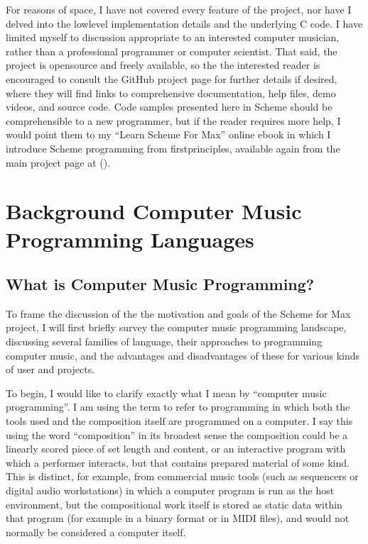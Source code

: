 \documentclass[letterpaper,10pt,english]{sphinxmanual}
\begin{document}
\sphinxAtStartPar
For reasons of space, I have not covered every feature of the project, nor have I delved into the
low\sphinxhyphen{}level implementation details and the underlying C code. I have limited myself to discussion appropriate
to an interested computer musician, rather than a professional programmer or computer scientist.
That said, the project is open\sphinxhyphen{}source and freely available, so the
the interested reader is encouraged to consult the GitHub project page for further details if desired,
where they will find links to comprehensive documentation, help files, demo videos, and source code.
Code samples presented here in Scheme should be comprehensible to a new programmer,
but if the reader requires more help, I would point them to my “Learn Scheme For Max” online
e\sphinxhyphen{}book in which I introduce Scheme programming from first\sphinxhyphen{}principles, available again
from the main project page at ().

\sphinxstepscope


\chapter{Background \sphinxhyphen{} Computer Music Programming Languages}
\label{\detokenize{background:background-computer-music-programming-languages}}\label{\detokenize{background::doc}}

\section{What is Computer Music Programming?}
\label{\detokenize{background:what-is-computer-music-programming}}
\sphinxAtStartPar
To frame the discussion of the the motivation and goals of the Scheme for Max project, I will
first briefly survey the computer music programming landscape, discussing several families of
language, their approaches to programming computer music, and the advantages and disadvantages of these
for various kinds of user and projects.

\sphinxAtStartPar
To begin, I would like to clarify exactly what I mean by “computer music programming”.
I am using the term to refer to programming in which both the tools used and the composition itself
are programmed on a computer.
I say this using the word “composition” in its broadest sense \sphinxhyphen{} the composition could
be a linearly scored piece of set length and content, or an interactive program with which
a performer interacts, but that contains prepared material of some kind.
This is distinct, for example, from commercial music tools (such as sequencers or digital
audio workstations) in which a computer program is run as the host environment, but the compositional
work itself is stored as static data within that program (for example in a binary format or
in MIDI files), and would not normally be considered a computer  itself.
\end{document}
